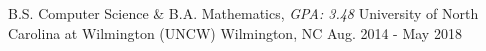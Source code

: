 

\begin{cventries}

  \cventry
    {B.S. Computer Science \& B.A. Mathematics, \textit{GPA: 3.48}} %
    {University of North Carolina at Wilmington (UNCW)} %
    {Wilmington, NC} %
    {Aug. 2014 - May 2018} %
    {}
  \vspace{-1em} %
\end{cventries}
